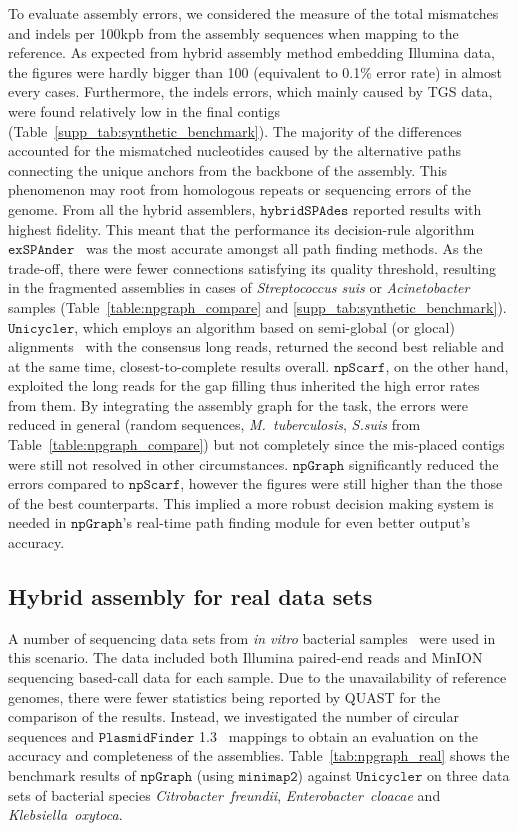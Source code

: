 \documentclass[10pt,twocolumn,twoside]{genpaper}
\newcommand{\npscarf}{$\mathtt{npScarf}$}
\newcommand{\npgraph}{$\mathtt{npGraph}$}
\newcommand{\unicycler}{$\mathtt{Unicycler}$}
\newcommand{\minimap}{$\mathtt{minimap2}$}
\begin{document}
To evaluate assembly errors, we considered the measure of the total mismatches and indels per 100kpb from the assembly sequences when mapping to the reference.
As expected from hybrid assembly method embedding Illumina data, the figures were hardly bigger than 100 (equivalent to 0.1\% error rate) in almost every cases.
Furthermore, the indels errors, which mainly caused by TGS data, were found relatively low in the final contigs (Table~\ref{supp_tab:synthetic_benchmark}).
The majority of the differences accounted for the mismatched nucleotides caused by the alternative paths connecting the unique anchors from the backbone of the assembly.
This phenomenon may root from homologous repeats or sequencing errors of the genome.
From all the hybrid assemblers, $\mathtt{hybridSPAdes}$ reported results with highest fidelity. This meant that the performance its decision-rule algorithm $\mathtt{exSPAnder}$~\cite{Prjibelski2014} was the most accurate amongst all path finding methods. As the trade-off, there were fewer connections satisfying its quality threshold, resulting in the fragmented assemblies in cases of \emph{Streptococcus suis} or \emph{Acinetobacter} samples (Table~\ref{table:npgraph_compare} and \ref{supp_tab:synthetic_benchmark}).
\unicycler{}, which employs an algorithm based on semi-global (or glocal) alignments~\cite{Brudno2003glocal} with the consensus long reads, returned the second best reliable and at the same time, closest-to-complete results overall.
\npscarf{}, on the other hand, exploited the long reads for the gap filling thus inherited the high error rates from them.
By integrating the assembly graph for the task, the errors were reduced in general (random sequences, \emph{M.~tuberculosis}, \emph{S.suis} from Table~\ref{table:npgraph_compare}) but not completely since the mis-placed contigs were still not resolved in other circumstances.
\npgraph{} significantly reduced the errors compared to \npscarf{}, however the figures were still higher than the those of the best counterparts.
This implied a more robust decision making system is needed in \npgraph{}'s real-time path finding module for even better output's accuracy.

\subsection*{Hybrid assembly for real data sets}
A number of sequencing data sets from \emph{in vitro} bacterial samples~\cite{George2017M14} were used in this scenario.
The data included both Illumina paired-end reads and MinION sequencing based-call data for each sample.
Due to the unavailability of reference genomes, there were fewer statistics being reported by QUAST for the comparison of the results. 
Instead, we investigated the number of circular sequences and $\mathtt{PlasmidFinder}$ 1.3~\cite{Carattoli2014} mappings to obtain an evaluation on the accuracy and completeness of the assemblies.
Table~\ref{tab:npgraph_real} shows the benchmark results of \npgraph{} (using \minimap{}) against \unicycler{} on three data sets of bacterial species \emph{Citrobacter~freundii}, \emph{Enterobacter~cloacae} and \emph{Klebsiella~oxytoca}. 
\end{document}
